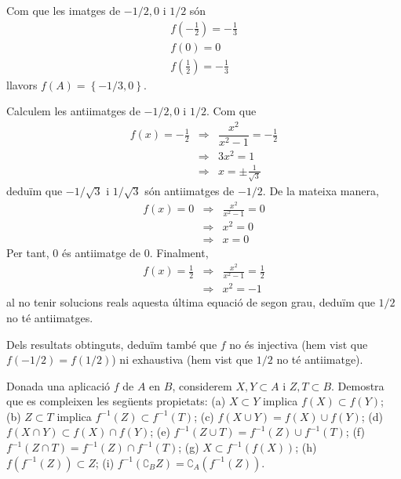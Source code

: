 \begin{solucio}
Com que les imatges de $-1/2,0$ i $1/2$ són%
\begin{equation*}
\begin{array}{l}
f(-\frac{1}{2})=-\frac{1}{3} \\
f(0)=0 \\
f(\frac{1}{2})=-\frac{1}{3}%
\end{array}%
\end{equation*}%
llavors $f(A)=\left\{ -1/3,0\right\} $.

Calculem les antiimatges de $-1/2,0$ i $1/2$. Com que%
\begin{equation*}
\begin{array}{lll}
f(x)=-\frac{1}{2} & \Longrightarrow & \dfrac{x^{2}}{x^{2}-1}=-\frac{1}{2} \\
& \Longrightarrow & 3x^{2}=1 \\
& \Longrightarrow & x=\pm \frac{1}{\sqrt{3}}%
\end{array}%
\end{equation*}%
deduïm que $-1/\sqrt{3}$ i $1/\sqrt{3}$ són antiimatges de $-1/2$.
De la mateixa manera,%
\begin{equation*}
\begin{array}{lll}
f(x)=0 & \Longrightarrow & \frac{x^{2}}{x^{2}-1}=0 \\
& \Longrightarrow & x^{2}=0 \\
& \Longrightarrow & x=0%
\end{array}%
\end{equation*}%
Per tant, $0$ és antiimatge de $0$. Finalment,%
\begin{equation*}
\begin{array}{lll}
f(x)=\frac{1}{2} & \Longrightarrow & \frac{x^{2}}{x^{2}-1}=\frac{1}{2} \\
& \Longrightarrow & x^{2}=-1%
\end{array}%
\end{equation*}%
al no tenir solucions reals aquesta última equació de segon grau,
deduïm que $1/2$ no té antiimatges.

Dels resultats obtinguts, deduïm també que $f$ no és injectiva
(hem vist que $f(-1/2)=f(1/2)$) ni exhaustiva (hem vist que $1/2$ no té
antiimatge).
\end{solucio}

\begin{exercici}
Donada una aplicació $f$ de $A$ en $B$, considerem $X,Y\subset A$ i $
Z,T\subset B$. Demostra que es compleixen les següents propietats: (a) $%
X\subset Y$ implica $f(X)\subset f(Y)$; (b) $Z\subset T$ implica $%
f^{-1}(Z)\subset f^{-1}(T)$; (c) $f(X\cup Y)=f(X)\cup f(Y)$; (d) $f(X\cap
Y)\subset f(X)\cap f(Y)$; (e) $f^{-1}(Z\cup T)=f^{-1}(Z)\cup f^{-1}(T)$; (f)
$f^{-1}(Z\cap T)=f^{-1}(Z)\cap f^{-1}(T)$; (g) $X\subset f^{-1}\left(
f(X)\right) $; (h) $f\left( f^{-1}(Z)\right) \subset Z$; (i) $f^{-1}\left(
\complement _{B}Z\right) =\complement _{A}\left( f^{-1}(Z)\right) $.
\end{exercici}


